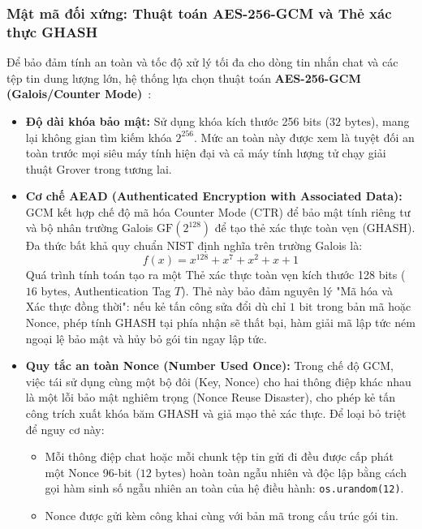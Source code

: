 \documentclass[a4paper,12pt]{article}
\begin{document}
\subsubsection{Mật mã đối xứng: Thuật toán AES-256-GCM và Thẻ xác thực GHASH}
Để bảo đảm tính an toàn và tốc độ xử lý tối đa cho dòng tin nhắn chat và các tệp tin dung lượng lớn, hệ thống lựa chọn thuật toán \textbf{AES-256-GCM (Galois/Counter Mode)}~\cite{sp80038d}:
\begin{itemize}
    \item \textbf{Độ dài khóa bảo mật:} Sử dụng khóa kích thước 256 bits ($32\text{ bytes}$), mang lại không gian tìm kiếm khóa $2^{256}$. Mức an toàn này được xem là tuyệt đối an toàn trước mọi siêu máy tính hiện đại và cả máy tính lượng tử chạy giải thuật Grover trong tương lai.
    \item \textbf{Cơ chế AEAD (Authenticated Encryption with Associated Data):} GCM kết hợp chế độ mã hóa Counter Mode (CTR) để bảo mật tính riêng tư và bộ nhân trường Galois $\text{GF}(2^{128})$ để tạo thẻ xác thực toàn vẹn (GHASH). Đa thức bất khả quy chuẩn NIST định nghĩa trên trường Galois là:
    \begin{equation}
        f(x) = x^{128} + x^7 + x^2 + x + 1
    \end{equation}
    Quá trình tính toán tạo ra một Thẻ xác thực toàn vẹn kích thước 128 bits ($16\text{ bytes}$, Authentication Tag $T$). Thẻ này bảo đảm nguyên lý "Mã hóa và Xác thực đồng thời": nếu kẻ tấn công sửa đổi dù chỉ $1\text{ bit}$ trong bản mã hoặc Nonce, phép tính GHASH tại phía nhận sẽ thất bại, hàm giải mã lập tức ném ngoại lệ bảo mật và hủy bỏ gói tin ngay lập tức.
    \item \textbf{Quy tắc an toàn Nonce (Number Used Once):} Trong chế độ GCM, việc tái sử dụng cùng một bộ đôi (Key, Nonce) cho hai thông điệp khác nhau là một lỗi bảo mật nghiêm trọng (Nonce Reuse Disaster), cho phép kẻ tấn công trích xuất khóa băm GHASH và giả mạo thẻ xác thực. Để loại bỏ triệt để nguy cơ này:
    \begin{itemize}
        \item Mỗi thông điệp chat hoặc mỗi chunk tệp tin gửi đi đều được cấp phát một Nonce 96-bit ($12\text{ bytes}$) hoàn toàn ngẫu nhiên và độc lập bằng cách gọi hàm sinh số ngẫu nhiên an toàn của hệ điều hành: \texttt{os.urandom(12)}.
        \item Nonce được gửi kèm công khai cùng với bản mã trong cấu trúc gói tin.
    \end{itemize}
\end{itemize}
\end{document}
